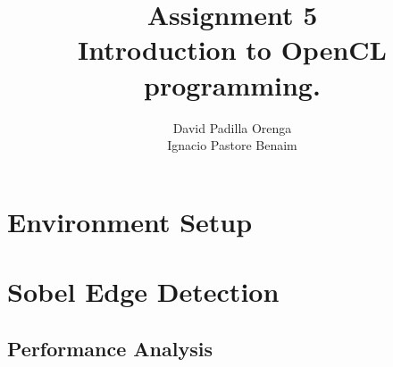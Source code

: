 \documentclass{article}
\title{Assignment 5 \\ \small Introduction to OpenCL programming.}
\author{David Padilla Orenga\\ Ignacio Pastore Benaim}
\date{}
\begin{document}
\maketitle

\section*{Environment Setup}














\section*{Sobel Edge Detection}



\subsection*{Performance Analysis}



\end{document}
